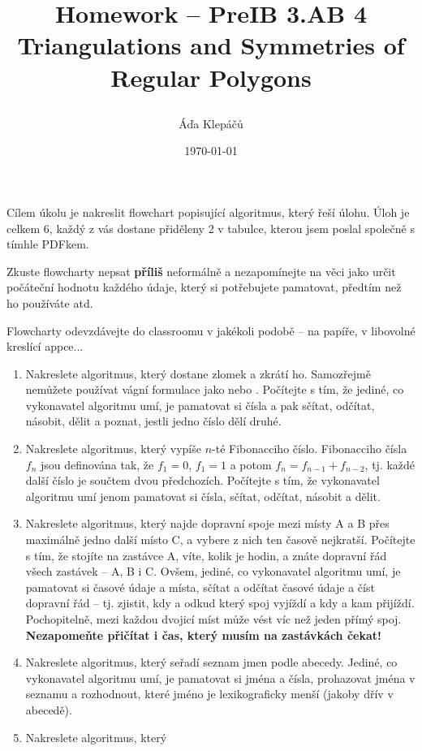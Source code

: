 \documentclass[a4paper,11pt]{article}
\title{\Huge\textsf{Homework -- PreIB 3.AB 4}\\
 \Large\textsf{Triangulations and Symmetries of Regular Polygons}
 \author{Áďa Klepáčů}
 \date{\today}
}
\begin{document}
\thispagestyle{fancy}

Cílem úkolu je nakreslit flowchart popisující algoritmus, který řeší úlohu. Úloh
je celkem 6, každý z vás dostane přiděleny 2 v tabulce, kterou jsem poslal
společně s tímhle PDFkem.

Zkuste flowcharty nepsat \textbf{příliš} neformálně a nezapomínejte na věci jako
určit počáteční hodnotu každého údaje, který si potřebujete pamatovat, předtím
než ho používáte atd.

Flowcharty odevzdávejte do classroomu v jakékoli podobě -- na papíře, v
libovolné kreslící appce...

\begin{enumerate}
 \item Nakreslete algoritmus, který dostane zlomek a zkrátí ho. Samozřejmě
  nemůžete používat vágní formulace jako  nebo .
  Počítejte s tím, že jediné, co vykonavatel algoritmu umí, je pamatovat si
  čísla a pak sčítat, odčítat, násobit, dělit a poznat, jestli jedno číslo dělí
  druhé.
 \item Nakreslete algoritmus, který vypíše $n$-té Fibonacciho číslo. Fibonacciho
  čísla $f_n$ jsou definována tak, že $f_1 = 0$, $f_1 = 1$ a potom $f_n =
  f_{n-1} + f_{n-2}$, tj. každé další číslo je součtem dvou předchozích.
  Počítejte s tím, že vykonavatel algoritmu umí jenom pamatovat si čísla,
  sčítat, odčítat, násobit a dělit.
 \item Nakreslete algoritmus, který najde dopravní spoje mezi místy A a B přes
  maximálně jedno další místo C, a vybere z nich ten časově nejkratší. Počítejte
  s tím, že stojíte na zastávce A, víte, kolik je hodin, a znáte dopravní řád
  všech zastávek -- A, B i C. Ovšem, jediné, co vykonavatel algoritmu umí, je
  pamatovat si časové údaje a místa, sčítat a odčítat časové údaje a číst
  dopravní řád -- tj. zjistit, kdy a odkud který spoj vyjíždí a kdy a kam
  přijíždí. Pochopitelně, mezi každou dvojicí míst může vést víc než jeden přímý
  spoj. \textbf{Nezapomeňte přičítat i čas, který musím na zastávkách čekat!}
 \item Nakreslete algoritmus, který seřadí seznam jmen podle abecedy. Jediné, co
  vykonavatel algoritmu umí, je pamatovat si jména a čísla, prohazovat jména v
  seznamu a rozhodnout, které jméno je lexikograficky menší (jakoby dřív v~
  abecedě).
 \item Nakreslete algoritmus, který 
\end{enumerate}
\end{document}
